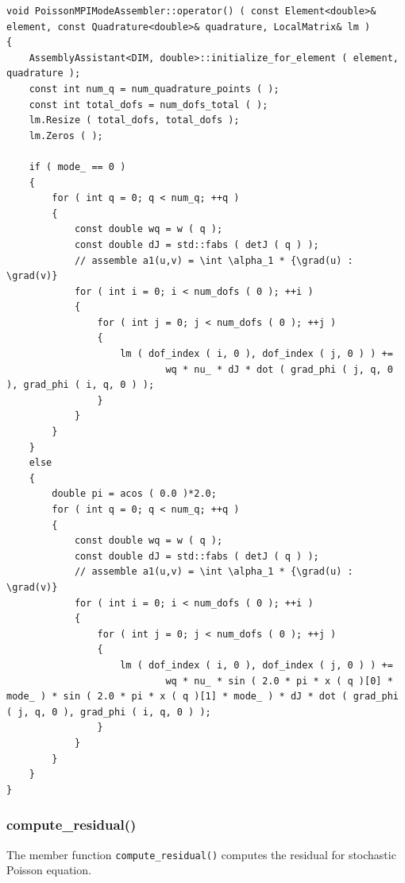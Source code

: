 \documentclass{article}
\begin{document}
\begin{lstlisting}
void PoissonMPIModeAssembler::operator() ( const Element<double>& element, const Quadrature<double>& quadrature, LocalMatrix& lm )
{
    AssemblyAssistant<DIM, double>::initialize_for_element ( element, quadrature );
    const int num_q = num_quadrature_points ( );
    const int total_dofs = num_dofs_total ( );
    lm.Resize ( total_dofs, total_dofs );
    lm.Zeros ( );

    if ( mode_ == 0 )
    {
        for ( int q = 0; q < num_q; ++q )
        {
            const double wq = w ( q );
            const double dJ = std::fabs ( detJ ( q ) );
            // assemble a1(u,v) = \int \alpha_1 * {\grad(u) : \grad(v)}
            for ( int i = 0; i < num_dofs ( 0 ); ++i )
            {
                for ( int j = 0; j < num_dofs ( 0 ); ++j )
                {
                    lm ( dof_index ( i, 0 ), dof_index ( j, 0 ) ) +=
                            wq * nu_ * dJ * dot ( grad_phi ( j, q, 0 ), grad_phi ( i, q, 0 ) );
                }
            }
        }
    }
    else
    {
        double pi = acos ( 0.0 )*2.0;
        for ( int q = 0; q < num_q; ++q )
        {
            const double wq = w ( q );
            const double dJ = std::fabs ( detJ ( q ) );
            // assemble a1(u,v) = \int \alpha_1 * {\grad(u) : \grad(v)}
            for ( int i = 0; i < num_dofs ( 0 ); ++i )
            {
                for ( int j = 0; j < num_dofs ( 0 ); ++j )
                {
                    lm ( dof_index ( i, 0 ), dof_index ( j, 0 ) ) +=
                            wq * nu_ * sin ( 2.0 * pi * x ( q )[0] * mode_ ) * sin ( 2.0 * pi * x ( q )[1] * mode_ ) * dJ * dot ( grad_phi ( j, q, 0 ), grad_phi ( i, q, 0 ) );
                }
            }
        }
    }
}
\end{lstlisting}

\subsubsection{compute\_residual()}

The member function \texttt{compute\_residual()} computes the residual for stochastic Poisson equation.
\end{document}
